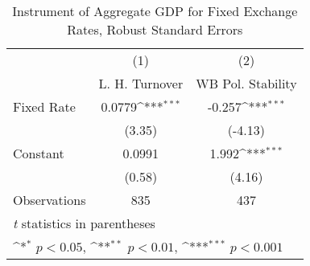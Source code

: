 \begin{table}[htbp]\centering
\def\sym#1{\ifmmode^{#1}\else\(^{#1}\)\fi}
\caption{Instrument of Aggregate GDP for Fixed Exchange Rates, Robust Standard Errors \label{miniRRIVs}}
\begin{tabular}{l*{2}{c}}
\toprule
                                        &\multicolumn{1}{c}{(1)}&\multicolumn{1}{c}{(2)}\\
                                        &\multicolumn{1}{c}{L. H. Turnover}&\multicolumn{1}{c}{WB Pol. Stability}\\
\midrule
Fixed Rate                              &   0.0779\sym{***}&   -0.257\sym{***}\\
                                        &   (3.35)         &  (-4.13)         \\
\addlinespace
Constant                                &   0.0991         &    1.992\sym{***}\\
                                        &   (0.58)         &   (4.16)         \\
\midrule
Observations                            &      835         &      437         \\
\bottomrule
\multicolumn{3}{l}{\footnotesize \textit{t} statistics in parentheses}\\
\multicolumn{3}{l}{\footnotesize \sym{*} \(p<0.05\), \sym{**} \(p<0.01\), \sym{***} \(p<0.001\)}\\
\end{tabular}
\end{table}
